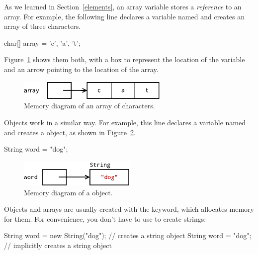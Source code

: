 
As we learned in Section~\ref{elements}, an array variable stores a {\em reference} to an array.
For example, the following line declares a variable named  and creates an array of three characters.

\begin{code}
    char[] array = {'c', 'a', 't'};
\end{code}

Figure~\ref{fig.mem2} shows them both, with a box to represent the location of the variable and an arrow pointing to the location of the array.

\begin{figure}[!ht]
\begin{center}
\includegraphics[width=205pt]{figs/mem2.pdf}
\caption{Memory diagram of an array of characters.}
\label{fig.mem2}
\end{center}
\end{figure}

Objects work in a similar way.
For example, this line declares a  variable named  and creates a  object, as shown in Figure~\ref{fig.mem3}.

\begin{code}
String word = "dog";
\end{code}

\begin{figure}[!ht]
\begin{center}
\includegraphics[width=160pt]{figs/mem3.pdf}
\caption{Memory diagram of a  object.}
\label{fig.mem3}
\end{center}
\end{figure}

Objects and arrays are usually created with the  keyword, which allocates memory for them. %
For convenience, you don't have to use  to create strings:

\begin{code}
String word = new String("dog");  // creates a string object
String word = "dog";   // implicitly creates a string object
\end{code}

